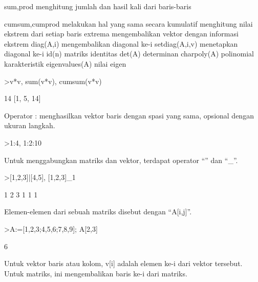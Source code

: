 \documentclass[a4paper,10pt]{article}
\begin{document}
\begin{eulernotebook}
\begin{eulercomment}
\begin{eulercomment}
\begin{eulercomment}
\begin{eulercomment}
\begin{eulercomment}
sum,prod menghitung jumlah dan hasil kali dari baris-baris\\
\end{eulercomment}
\begin{eulerttcomment}
 cumsum,cumprod melakukan hal yang sama secara kumulatif
 menghitung nilai ekstrem dari setiap baris
 extrema mengembalikan vektor dengan informasi ekstrem
 diag(A,i) mengembalikan diagonal ke-i
 setdiag(A,i,v) menetapkan diagonal ke-i
 id(n) matriks identitas
 det(A) determinan
 charpoly(A) polinomial karakteristik
 eigenvalues(A) nilai eigen
\end{eulerttcomment}
\begin{eulerprompt}
>v*v, sum(v*v), cumsum(v*v)
\end{eulerprompt}
\begin{euleroutput}
  [1,  4,  9]
  14
  [1,  5,  14]
\end{euleroutput}
\begin{eulercomment}
Operator : menghasilkan vektor baris dengan spasi yang sama, opsional
dengan ukuran langkah.
\end{eulercomment}
\begin{eulerprompt}
>1:4, 1:2:10
\end{eulerprompt}
\begin{euleroutput}
  [1,  2,  3,  4]
  [1,  3,  5,  7,  9]
\end{euleroutput}
\begin{eulercomment}
Untuk menggabungkan matriks dan vektor, terdapat operator “\textbar{}” dan “\_”.
\end{eulercomment}
\begin{eulerprompt}
>[1,2,3]|[4,5], [1,2,3]_1
\end{eulerprompt}
\begin{euleroutput}
  [1,  2,  3,  4,  5]
              1             2             3 
              1             1             1 
\end{euleroutput}
\begin{eulercomment}
Elemen-elemen dari sebuah matriks disebut dengan “A[i,j]”.
\end{eulercomment}
\begin{eulerprompt}
>A:=[1,2,3;4,5,6;7,8,9]; A[2,3]
\end{eulerprompt}
\begin{euleroutput}
  6
\end{euleroutput}
\begin{eulercomment}
Untuk vektor baris atau kolom, v[i] adalah elemen ke-i dari vektor
tersebut. Untuk matriks, ini mengembalikan baris ke-i dari matriks.

\end{eulercomment}
\end{eulercomment}
\end{eulercomment}
\end{eulercomment}
\end{eulercomment}
\end{eulernotebook}
\end{document}
